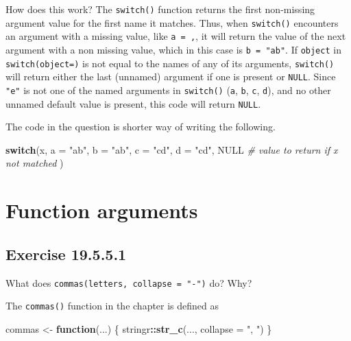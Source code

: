 \documentclass[]{book}
\newenvironment{Shaded}{\begin{snugshade}}{\end{snugshade}}
\newcommand{\CommentTok}[1]{\textcolor[rgb]{0.56,0.35,0.01}{\textit{#1}}}
\newcommand{\ControlFlowTok}[1]{\textcolor[rgb]{0.13,0.29,0.53}{\textbf{#1}}}
\newcommand{\DataTypeTok}[1]{\textcolor[rgb]{0.13,0.29,0.53}{#1}}
\newcommand{\KeywordTok}[1]{\textcolor[rgb]{0.13,0.29,0.53}{\textbf{#1}}}
\newcommand{\NormalTok}[1]{#1}
\newcommand{\OperatorTok}[1]{\textcolor[rgb]{0.81,0.36,0.00}{\textbf{#1}}}
\newcommand{\OtherTok}[1]{\textcolor[rgb]{0.56,0.35,0.01}{#1}}
\newcommand{\StringTok}[1]{\textcolor[rgb]{0.31,0.60,0.02}{#1}}
\theoremstyle{plain}
\theoremstyle{remark}
\begin{document}
How does this work? The \texttt{switch()} function returns the first
non-missing argument value for the first name it matches. Thus, when
\texttt{switch()} encounters an argument with a missing value, like
\texttt{a\ =\ ,}, it will return the value of the next argument with a
non missing value, which in this case is \texttt{b\ =\ "ab"}. If
\texttt{object} in \texttt{switch(object=)} is not equal to the names of
any of its arguments, \texttt{switch()} will return either the last
(unnamed) argument if one is present or \texttt{NULL}. Since
\texttt{"e"} is not one of the named arguments in \texttt{switch()}
(\texttt{a}, \texttt{b}, \texttt{c}, \texttt{d}), and no other unnamed
default value is present, this code will return \texttt{NULL}.

The code in the question is shorter way of writing the following.

\begin{Shaded}
\begin{Highlighting}[]
\ControlFlowTok{switch}\NormalTok{(x,}
  \DataTypeTok{a =} \StringTok{"ab"}\NormalTok{,}
  \DataTypeTok{b =} \StringTok{"ab"}\NormalTok{,}
  \DataTypeTok{c =} \StringTok{"cd"}\NormalTok{,}
  \DataTypeTok{d =} \StringTok{"cd"}\NormalTok{,}
  \OtherTok{NULL}  \CommentTok{# value to return if x not matched}
\NormalTok{)}
\end{Highlighting}
\end{Shaded}

\hypertarget{function-arguments}{%
\section{Function arguments}\label{function-arguments}}

\hypertarget{exercise-19.5.5.1}{%
\subsection*{\texorpdfstring{Exercise
{19.5.5.1}}{Exercise 19.5.5.1}}\label{exercise-19.5.5.1}}

What does \texttt{commas(letters,\ collapse\ =\ "-")} do? Why?

The \texttt{commas()} function in the chapter is defined as

\begin{Shaded}
\begin{Highlighting}[]
\NormalTok{commas <-}\StringTok{ }\ControlFlowTok{function}\NormalTok{(...) \{}
\NormalTok{  stringr}\OperatorTok{::}\KeywordTok{str_c}\NormalTok{(..., }\DataTypeTok{collapse =} \StringTok{", "}\NormalTok{)}
\NormalTok{\}}
\end{Highlighting}
\end{Shaded}
\end{document}

